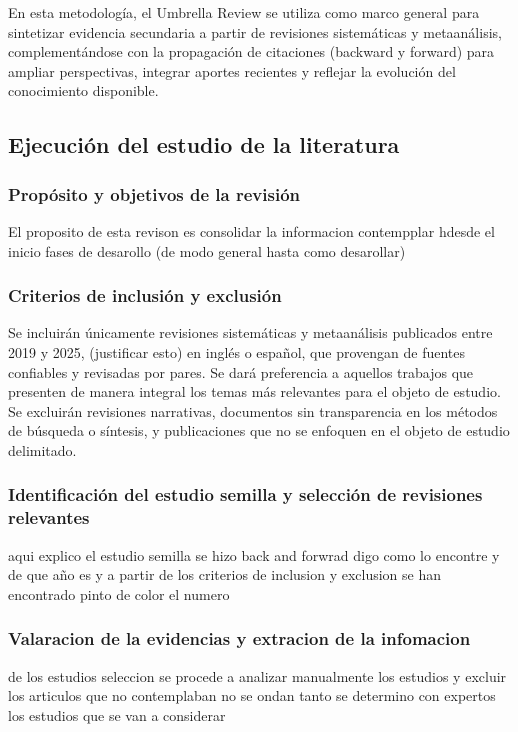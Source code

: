 En esta metodología, el Umbrella Review se utiliza como marco general para sintetizar evidencia secundaria a partir de revisiones sistemáticas y 
metaanálisis, complementándose con la propagación de citaciones (backward y forward) para ampliar perspectivas, integrar aportes recientes y 
reflejar la evolución del conocimiento disponible.

\subsection{Ejecución del estudio de la literatura}
\subsubsection{Propósito y objetivos de la revisión}
El proposito de esta revison es consolidar la informacion contempplar hdesde el inicio fases de desarollo (de modo general hasta como desarollar)

\subsubsection{Criterios de inclusión y exclusión}
Se incluirán únicamente revisiones sistemáticas y metaanálisis publicados entre 2019 y 2025, (justificar esto) en inglés o español, que provengan de fuentes confiables y revisadas por pares. Se dará preferencia a aquellos trabajos que presenten de manera integral los temas más relevantes para el objeto de estudio. 
    Se excluirán revisiones narrativas, documentos sin transparencia en los métodos de búsqueda o síntesis, y publicaciones que no se enfoquen en el objeto de estudio delimitado.

\subsubsection{Identificación del estudio semilla y selección de revisiones relevantes}
aqui explico el estudio semilla se hizo back and forwrad digo como lo encontre y de que año es 
y a partir de los criterios de inclusion y exclusion se han encontrado pinto de color el numero 

\subsubsection{Valaracion de la evidencias y extracion de la infomacion}
de los estudios seleccion se procede a analizar manualmente los estudios y excluir los articulos que no contemplaban no se ondan tanto 
se determino con expertos los estudios que se van a considerar





